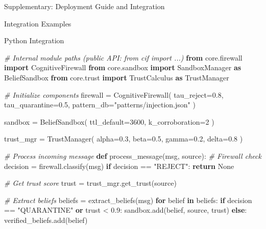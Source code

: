 \documentclass[
  ignorenonframetext,
]{beamer}
\newenvironment{Shaded}{}{}
\newcommand{\CommentTok}[1]{\textcolor[rgb]{0.38,0.63,0.69}{\textit{#1}}}
\newcommand{\ControlFlowTok}[1]{\textcolor[rgb]{0.00,0.44,0.13}{\textbf{#1}}}
\newcommand{\DecValTok}[1]{\textcolor[rgb]{0.25,0.63,0.44}{#1}}
\newcommand{\FloatTok}[1]{\textcolor[rgb]{0.25,0.63,0.44}{#1}}
\newcommand{\ImportTok}[1]{\textcolor[rgb]{0.00,0.50,0.00}{\textbf{#1}}}
\newcommand{\KeywordTok}[1]{\textcolor[rgb]{0.00,0.44,0.13}{\textbf{#1}}}
\newcommand{\NormalTok}[1]{#1}
\newcommand{\OperatorTok}[1]{\textcolor[rgb]{0.40,0.40,0.40}{#1}}
\newcommand{\StringTok}[1]{\textcolor[rgb]{0.25,0.44,0.63}{#1}}
\newcommand{\VariableTok}[1]{\textcolor[rgb]{0.10,0.09,0.49}{#1}}
\begin{document}
\begin{frame}[fragile]{Supplementary: Deployment Guide and Integration}
\begin{block}{Integration Examples}
\protect{}\label{sec:integration-examples}
\begin{block}{Python Integration}
\protect{}\label{sec:python-integration}
\begin{Shaded}
\begin{Highlighting}[]
\CommentTok{\# Internal module paths (public API: \textasciigrave{}from cif import ...\textasciigrave{})}
\ImportTok{from}\NormalTok{ core.firewall }\ImportTok{import}\NormalTok{ CognitiveFirewall}
\ImportTok{from}\NormalTok{ core.sandbox }\ImportTok{import}\NormalTok{ SandboxManager }\ImportTok{as}\NormalTok{ BeliefSandbox}
\ImportTok{from}\NormalTok{ core.trust }\ImportTok{import}\NormalTok{ TrustCalculus }\ImportTok{as}\NormalTok{ TrustManager}

\CommentTok{\# Initialize components}
\NormalTok{firewall }\OperatorTok{=}\NormalTok{ CognitiveFirewall(}
\NormalTok{    tau\_reject}\OperatorTok{=}\FloatTok{0.8}\NormalTok{,}
\NormalTok{    tau\_quarantine}\OperatorTok{=}\FloatTok{0.5}\NormalTok{,}
\NormalTok{    pattern\_db}\OperatorTok{=}\StringTok{"patterns/injection.json"}
\NormalTok{)}

\NormalTok{sandbox }\OperatorTok{=}\NormalTok{ BeliefSandbox(}
\NormalTok{    ttl\_default}\OperatorTok{=}\DecValTok{3600}\NormalTok{,}
\NormalTok{    k\_corroboration}\OperatorTok{=}\DecValTok{2}
\NormalTok{)}

\NormalTok{trust\_mgr }\OperatorTok{=}\NormalTok{ TrustManager(}
\NormalTok{    alpha}\OperatorTok{=}\FloatTok{0.3}\NormalTok{, beta}\OperatorTok{=}\FloatTok{0.5}\NormalTok{, gamma}\OperatorTok{=}\FloatTok{0.2}\NormalTok{,}
\NormalTok{    delta}\OperatorTok{=}\FloatTok{0.8}
\NormalTok{)}

\CommentTok{\# Process incoming message}
\KeywordTok{def}\NormalTok{ process\_message(msg, source):}
    \CommentTok{\# Firewall check}
\NormalTok{    decision }\OperatorTok{=}\NormalTok{ firewall.classify(msg)}
    \ControlFlowTok{if}\NormalTok{ decision }\OperatorTok{==} \StringTok{"REJECT"}\NormalTok{:}
        \ControlFlowTok{return} \VariableTok{None}

    \CommentTok{\# Get trust score}
\NormalTok{    trust }\OperatorTok{=}\NormalTok{ trust\_mgr.get\_trust(source)}

    \CommentTok{\# Extract beliefs}
\NormalTok{    beliefs }\OperatorTok{=}\NormalTok{ extract\_beliefs(msg)}
    \ControlFlowTok{for}\NormalTok{ belief }\KeywordTok{in}\NormalTok{ beliefs:}
        \ControlFlowTok{if}\NormalTok{ decision }\OperatorTok{==} \StringTok{"QUARANTINE"} \KeywordTok{or}\NormalTok{ trust }\OperatorTok{\textless{}} \FloatTok{0.9}\NormalTok{:}
\NormalTok{            sandbox.add(belief, source, trust)}
        \ControlFlowTok{else}\NormalTok{:}
\NormalTok{            verified\_beliefs.add(belief)}


\end{Highlighting}
\end{Shaded}
\end{block}
\end{block}
\end{frame}
\end{document}
